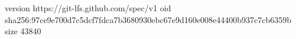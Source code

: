 version https://git-lfs.github.com/spec/v1
oid sha256:97ce9e700d7c5dcf7fdca7b3680930ebc67e9d160e008e44400b937c7cb6359b
size 43840
